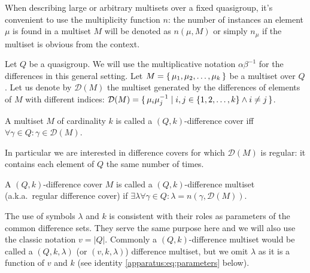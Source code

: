 
When describing large or arbitrary multisets over a fixed quasigroup, it's convenient to use the multiplicity function $n$: the number of instances an element $\mu$ is found in a multiset $M$ will be denoted as $n(\mu,M)$ or simply $n_\mu$ if the multiset is obvious from the context.

Let $Q$ be a quasigroup.
We will use the multiplicative notation $\alpha\beta^{-1}$ for the differences in this general setting.
Let $M=\set{\mu_1, \mu_2, \ldots, \mu_k}$ be a multiset over $Q$. 
Let us denote by $\mathcal D(M)$ the multiset generated by the differences of elements of $M$ with different indices: 
$\mathcal D (M) = \set{\mu_i\mu_j^{-1} \mid i, j \in \{1,2,\ldots,k\} \land i \neq j}$.

\begin{definition}
    \label{dms:def:dc}
    A multiset $M$ of cardinality $k$ is called a $(Q,k)$-difference cover iff $\forall \gamma \in Q \colon \gamma \in \mathcal D(M)$.
\end{definition}

In particular we are interested in difference covers 
for which $\mathcal D(M)$ is regular: it contains each element of $Q$ the same number of times.

\begin{definition}
    \label{dms:def:dms}
    A $(Q,k)$-difference cover $M$ is called a $(Q,k)$-difference multiset (a.k.a.\ regular difference cover) if $\exists \lambda  \forall \gamma \in Q \colon \lambda = n(\gamma, \mathcal D(M))$.
\end{definition}

The use of symbols $\lambda$ and $k$ is consistent with their roles as parameters of the common difference sets. They serve the same purpose here and we will also use the classic notation $v = |Q|$. Commonly a $(Q,k)$-difference multiset would be called a $(Q,k,\lambda)$ (or $(v,k,\lambda)$) difference multiset, but we omit $\lambda$ as it is a function of $v$ and $k$ 
(see identity \eqref{apparatus:eq:parameters} below).

